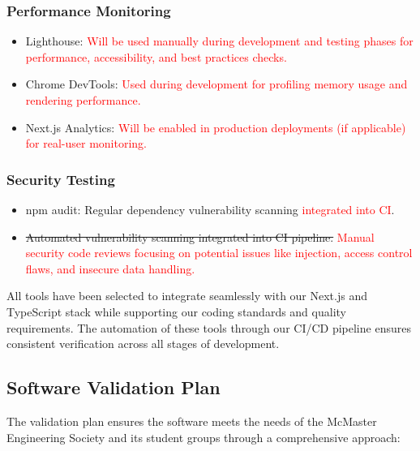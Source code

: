 \documentclass[12pt, titlepage]{article}
\begin{document}
\subsubsection*{Performance Monitoring}
\begin{itemize}
    \item Lighthouse: \textcolor{red}{Will be used manually during development and testing phases for performance, accessibility, and best practices checks.}
    \item Chrome DevTools: \textcolor{red}{Used during development for profiling memory usage and rendering performance.}
    \item Next.js Analytics: \textcolor{red}{Will be enabled in production deployments (if applicable) for real-user monitoring.}
\end{itemize}

\subsubsection*{Security Testing}
\begin{itemize}
    \item npm audit: Regular dependency vulnerability scanning \textcolor{red}{integrated into CI}.
    \item \sout{Automated vulnerability scanning integrated into CI pipeline.} \textcolor{red}{Manual security code reviews focusing on potential issues like injection, access control flaws, and insecure data handling.}
\end{itemize}

All tools have been selected to integrate seamlessly with our Next.js and TypeScript stack while supporting our coding standards and quality requirements. The automation of these tools through our CI/CD pipeline ensures consistent verification across all stages of development.

\subsection{Software Validation Plan}
The validation plan ensures the software meets the needs of the McMaster Engineering Society and its student groups through a comprehensive approach:
\end{document}
